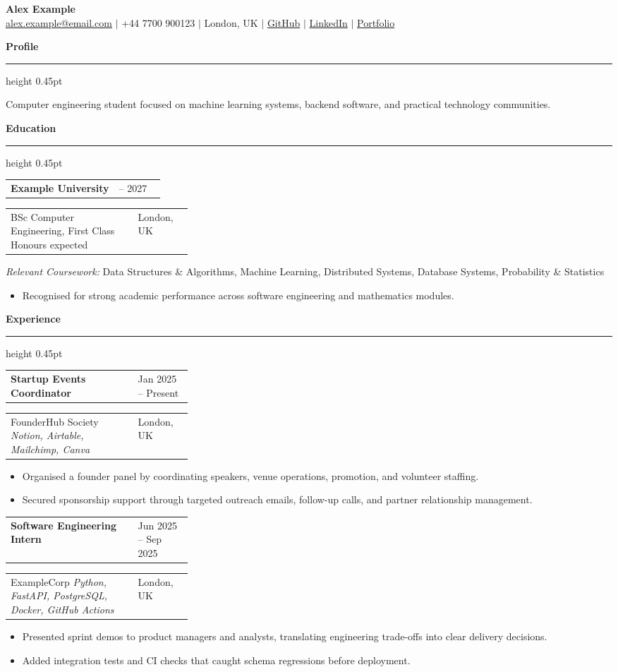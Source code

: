 \documentclass[10pt,a4paper]{article}
\makeatletter
\newcommand{\cvsection}[1]{%
  \vspace{6pt}%
  {\large\bfseries\color{AccentBlue} #1}\\[-2pt]%
  {\color{AccentBlue}\hrule height 0.45pt}%
  \vspace{3pt}%
}
\newcommand{\cvrow}[2]{%
  \begin{tabularx}{\linewidth}{@{}X>{\raggedleft\arraybackslash}p{0.30\linewidth}@{}}
    #1 & #2
  \end{tabularx}
}
\newcommand{\cventryspace}{\vspace{2pt}}
\makeatother
\begin{document}
\begin{center}
  {\LARGE\bfseries Alex Example}\\[3pt]
  \small\href{mailto:alex.example@email.com}{alex.example@email.com} $\vert$ +44 7700 900123 $\vert$ London, UK $\vert$ \href{\detokenize{https://github.com/alex-example}}{GitHub} $\vert$ \href{\detokenize{https://www.linkedin.com/in/alex-example}}{LinkedIn} $\vert$ \href{\detokenize{https://alexexample.dev}}{Portfolio}
\end{center}

\cvsection{ Profile }
Computer engineering student focused on machine learning systems, backend software, and practical technology communities.

\cvsection{ Education }
\cvrow{\textbf{ Example University }}{ 2023 -- 2027 }
\cvrow{ BSc Computer Engineering, First Class Honours expected}{ London, UK }
\textit{Relevant Coursework:} Data Structures \& Algorithms, Machine Learning, Distributed Systems, Database Systems, Probability \& Statistics
\begin{itemize}
  \item Recognised for strong academic performance across software engineering and mathematics modules.
\end{itemize}
\cventryspace

\cvsection{ Experience }
\cvrow{\textbf{ Startup Events Coordinator }}{ Jan 2025 -- Present }
\cvrow{ FounderHub Society \textbar{} \textit{ Notion, Airtable, Mailchimp, Canva }}{ London, UK }
\begin{itemize}
  \item Organised a founder panel by coordinating speakers, venue operations, promotion, and volunteer staffing.
  \item Secured sponsorship support through targeted outreach emails, follow-up calls, and partner relationship management.
\end{itemize}
\cventryspace
\cvrow{\textbf{ Software Engineering Intern }}{ Jun 2025 -- Sep 2025 }
\cvrow{ ExampleCorp \textbar{} \textit{ Python, FastAPI, PostgreSQL, Docker, GitHub Actions }}{ London, UK }
\begin{itemize}
  \item Presented sprint demos to product managers and analysts, translating engineering trade-offs into clear delivery decisions.
  \item Added integration tests and CI checks that caught schema regressions before deployment.
\end{itemize}
\cventryspace
\end{document}
